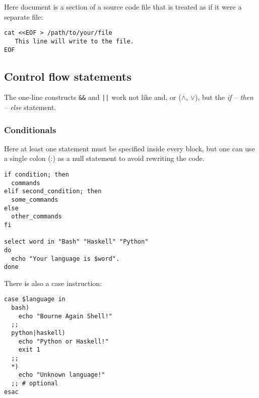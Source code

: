 Here document is a section of a source code file that is treated as if it were a separate file:

\begin{verbatim}
cat <<EOF > /path/to/your/file
   This line will write to the file.
EOF
\end{verbatim}


\subsection{Control flow statements}
The one-line constructs \texttt{\&\&} and \texttt{||} work not like and, or ($\wedge$, $\vee$), but the \emph{if -- then -- else} statement.

\subsubsection{Conditionals}
Here at least one statement must be specified inside every block,
but one can use a single colon (:) as a null statement to avoid
rewriting the code.

\begin{verbatim}
if condition; then
  commands
elif second_condition; then
  some_commands
else
  other_commands	
fi

select word in "Bash" "Haskell" "Python"
do
  echo "Your language is $word".
done
\end{verbatim}

There is also a case instruction:
\begin{verbatim}
case $language in
  bash)
    echo "Bourne Again Shell!"
  ;;
  python|haskell)
    echo "Python or Haskell!"
    exit 1
  ;;
  *)
    echo "Unknown language!"
  ;; # optional
esac
\end{verbatim}

